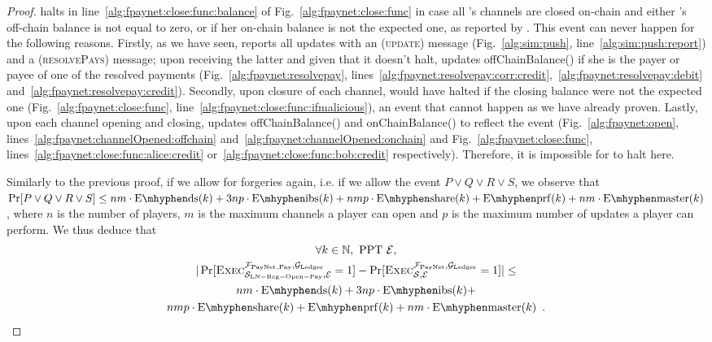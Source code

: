\begin{proof}
  \fpaynet{} halts in line~\ref{alg:fpaynet:close:func:balance} of
  Fig.~\ref{alg:fpaynet:close:func} in case all \alice's channels are closed
  on-chain and either \alice's off-chain balance is not equal to zero, or if her
  on-chain balance is not the expected one, as reported by \simulator. This
  event can never happen for the following reasons. Firstly, as we have seen,
  \simulator{} reports all updates with an (\textsc{update}) message
  (Fig.~\ref{alg:sim:push}, line~\ref{alg:sim:push:report}) and a
  (\textsc{resolvePays}) message; upon receiving the latter and given that it
  doesn't halt, \fpaynet{} updates offChainBalance(\alice) if she is the payer
  or payee of one of the resolved payments (Fig.~\ref{alg:fpaynet:resolvepay},
  lines~\ref{alg:fpaynet:resolvepay:corr:credit},~\ref{alg:fpaynet:resolvepay:debit}
  and~\ref{alg:fpaynet:resolvepay:credit}). Secondly, upon closure of each
  channel, \fpaynet{} would have halted if the closing balance were not the
  expected one (Fig.~\ref{alg:fpaynet:close:func},
  line~\ref{alg:fpaynet:close:func:ifmalicious}), an event that cannot happen as
  we have already proven. Lastly, upon each channel opening and closing,
  \fpaynet{} updates offChainBalance(\alice) and onChainBalance(\alice) to
  reflect the event (Fig.~\ref{alg:fpaynet:open},
  lines~\ref{alg:fpaynet:channelOpened:offchain}
  and~\ref{alg:fpaynet:channelOpened:onchain} and
  Fig.~\ref{alg:fpaynet:close:func},
  lines~\ref{alg:fpaynet:close:func:alice:credit}
  or~\ref{alg:fpaynet:close:func:bob:credit} respectively). Therefore, it is
  impossible for \fpaynet{} to halt here.

  Similarly to the previous proof, if we allow for forgeries again, i.e. if we
  allow the event $P \vee Q \vee R \vee S$, we observe that $\Pr[P \vee Q \vee R
  \vee S] \leq nm \cdot \mathrm{E \mhyphen ds}(k) + 3np \cdot \mathrm{E \mhyphen
  ibs}(k) + nmp \cdot \mathrm{E \mhyphen share}(k) + \mathrm{E \mhyphen prf}(k)
  + nm \cdot \mathrm{E \mhyphen master}(k)$, where $n$ is the number of players,
  $m$ is the maximum channels a player can open and $p$ is the maximum number of
  updates a player can perform. We thus deduce that
  \begin{gather*}
    \forall k \in \mathbb{N}, \text{ PPT } \environment, \\
    |\Pr[\textsc{Exec}^{\fpaynet{}_{\mathrm{, Pay}},
    \ledger}_{\simulator_{\mathrm{LN - Reg - Open - Pay}}, \environment} = 1] -
    \Pr[\textsc{Exec}^{\fpaynet, \ledger}_{\simulator, \environment} = 1]| \leq
    \\
    nm \cdot \mathrm{E \mhyphen ds}(k) + 3np \cdot \mathrm{E \mhyphen ibs}(k) +
    \\
    nmp \cdot \mathrm{E \mhyphen share}(k) + \mathrm{E \mhyphen prf}(k) + nm
    \cdot \mathrm{E \mhyphen master}(k) \enspace.
  \end{gather*}
\end{proof}
